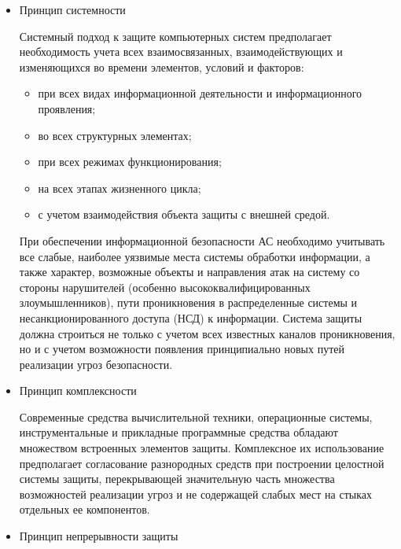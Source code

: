 \begin{itemize}
\item Принцип системности

Системный подход к защите компьютерных систем предполагает необходимость учета всех взаимосвязанных, взаимодействующих и изменяющихся во времени элементов, условий и факторов:
\begin{itemize}
\item при всех видах информационной деятельности и информационного проявления;
\item во всех структурных элементах;
\item при всех режимах функционирования;
\item на всех этапах жизненного цикла;
\item с учетом взаимодействия объекта защиты с внешней средой.
\end{itemize}

При обеспечении информационной безопасности АС необходимо учитывать все слабые, наиболее уязвимые места системы обработки информации, а также характер, возможные объекты и направления атак на систему со стороны нарушителей (особенно высококвалифицированных злоумышленников), пути проникновения в распределенные системы и несанкционированного доступа (НСД) к информации. Система защиты должна строиться не только с учетом всех известных каналов проникновения, но и с учетом возможности появления принципиально новых путей реализации угроз безопасности.

\item Принцип комплексности

Современные средства вычислительной техники, операционные системы, инструментальные и прикладные программные средства обладают множеством встроенных элементов защиты. Комплексное их использование предполагает согласование разнородных средств при построении целостной системы защиты, перекрывающей значительную часть множества возможностей реализации угроз и не содержащей слабых мест на стыках отдельных ее компонентов.

\item Принцип непрерывности защиты


\end{itemize}
